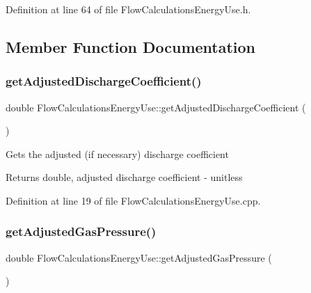 Definition at line 64 of file Flow\+Calculations\+Energy\+Use.\+h.



\subsection{Member Function Documentation}
\mbox{\label{class_flow_calculations_energy_use_a16444682b7c914d18d8456bf399b8bd2}} 
\subsubsection{\texorpdfstring{get\+Adjusted\+Discharge\+Coefficient()}{getAdjustedDischargeCoefficient()}}
{\footnotesize\ttfamily double Flow\+Calculations\+Energy\+Use\+::get\+Adjusted\+Discharge\+Coefficient (\begin{DoxyParamCaption}{ }\end{DoxyParamCaption})}

Gets the adjusted (if necessary) discharge coefficient

\begin{DoxyReturn}{Returns}
double, adjusted discharge coefficient -\/ unitless 
\end{DoxyReturn}


Definition at line 19 of file Flow\+Calculations\+Energy\+Use.\+cpp.

\mbox{\label{class_flow_calculations_energy_use_a8633821730568a5b1449914060c52aad}} 
\subsubsection{\texorpdfstring{get\+Adjusted\+Gas\+Pressure()}{getAdjustedGasPressure()}}
{\footnotesize\ttfamily double Flow\+Calculations\+Energy\+Use\+::get\+Adjusted\+Gas\+Pressure (\begin{DoxyParamCaption}{ }\end{DoxyParamCaption})}

